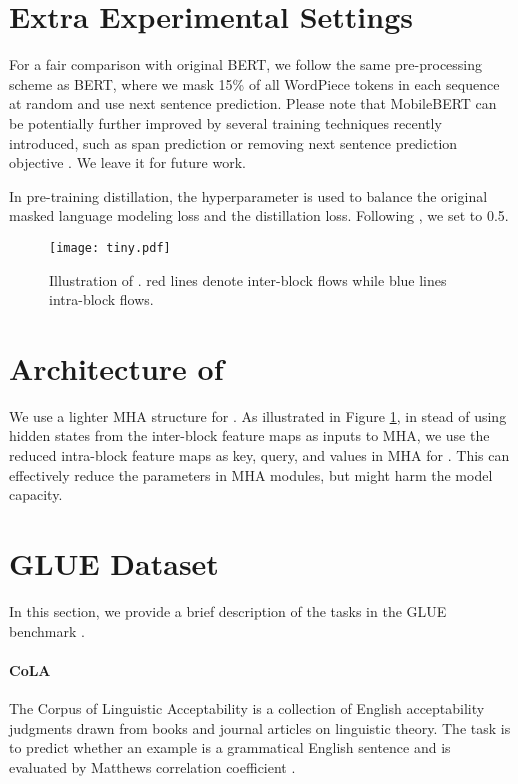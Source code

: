 \documentclass[11pt,a4paper]{article}
\begin{document}
\section{Extra Experimental Settings}

For a fair comparison with original BERT, we follow the same pre-processing scheme as BERT, where we mask 15\% of all WordPiece \citep{kudo2018sentencepiece} tokens in each sequence at random and use next sentence prediction. Please note that MobileBERT can be potentially further improved by several training techniques recently introduced, such as span prediction \citep{joshi2019spanbert} or removing next sentence prediction objective \citep{liu2019roberta}. We leave it for future work.

In pre-training distillation, the hyperparameter  is used to balance the original masked language modeling loss and the distillation loss. Following \citep{kim2016sequence}, we set  to 0.5.

\begin{figure}[t]
	\centering
	\texttt{[image: tiny.pdf]}
	\caption{Illustration of .
	\textcolor{myred}{red lines denote {inter-block} flows} while \textcolor{myblue}{{blue lines} {intra-block} flows}.
	}
\label{fig:tiny}
\end{figure}

\section{Architecture of }

We use a lighter MHA structure for . As illustrated in Figure \ref{fig:tiny}, in stead of using hidden states from the inter-block feature maps as inputs to MHA, we use the reduced intra-block feature maps as key, query, and values in MHA for . This can effectively reduce the parameters in MHA modules, but might harm the model capacity.

\section{GLUE Dataset}\label{app:glue}
	
In this section, we provide a brief description of the tasks in the GLUE benchmark \citep{wang2018glue}.

\paragraph{CoLA} The Corpus of Linguistic Acceptability \citep{warstadt2018neural} is a collection of English acceptability judgments drawn from books and journal articles on linguistic theory. The task is to predict whether an example is a grammatical English sentence and is evaluated by Matthews correlation coefficient \citep{matthews1975comparison}.
\end{document}
